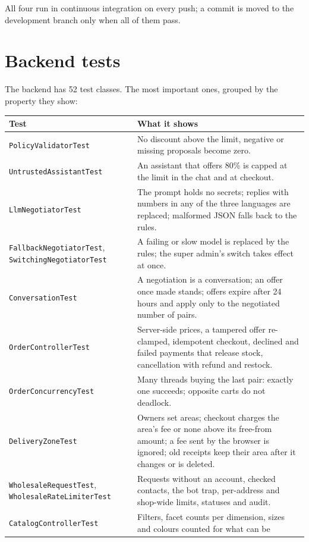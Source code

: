 All four run in continuous integration on every push; a commit is moved to the development branch only when all of them
pass.

\section{Backend tests}
\label{sec:backend-tests}

The backend has 52 test classes. The most important ones, grouped by the property they show:

\begingroup\small
\begin{longtable}{p{5.3cm} p{8.7cm}}
	\toprule
	\textbf{Test} & \textbf{What it shows} \\
	\midrule
	\endhead
	\texttt{PolicyValidatorTest} & No discount above the limit, negative or missing proposals become zero. \\
	\texttt{UntrustedAssistantTest} & An assistant that offers 80\% is capped at the limit in the chat and at checkout. \\
	\texttt{LlmNegotiatorTest} & The prompt holds no secrets; replies with numbers in any of the three languages are
	replaced; malformed JSON falls back to the rules. \\
	\texttt{FallbackNegotiatorTest}, \texttt{SwitchingNegotiatorTest} & A failing or slow model is replaced by the
	rules; the super admin's switch takes effect at once. \\
	\texttt{ConversationTest} & A negotiation is a conversation; an offer once made stands; offers expire after 24 hours
	and apply only to the negotiated number of pairs. \\
	\texttt{OrderControllerTest} & Server-side prices, a tampered offer re-clamped, idempotent checkout, declined and
	failed payments that release stock, cancellation with refund and restock. \\
	\texttt{OrderConcurrencyTest} & Many threads buying the last pair: exactly one succeeds; opposite carts do not
	deadlock. \\
	\texttt{DeliveryZoneTest} & Owners set areas; checkout charges the area's fee or none above its free-from amount; a
	fee sent by the browser is ignored; old receipts keep their area after it changes or is deleted. \\
	\texttt{WholesaleRequestTest}, \texttt{WholesaleRateLimiterTest} & Requests without an account, checked contacts,
	the bot trap, per-address and shop-wide limits, statuses and audit. \\
	\texttt{CatalogControllerTest} & Filters, facet counts per dimension, sizes and colours counted for what can be

\end{longtable}
